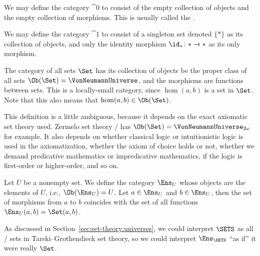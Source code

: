 \begin{example}
We may define the category $\cat{0}$ to consist of the empty
collection of objects and the empty collection of morphisms. This is
usually called the .

We may define the category $\cat{1}$ to consist of a singleton set
denoted $\{*\}$ as its collection of objects, and only the identity
morphism $\id_{*}\colon *\to *$ as its only morphism.
\end{example}

\begin{example}
\end{example}

\begin{example}
The category of all sets $\Set$ has its collection of objects be the
proper class of all sets $\Ob(\Set)=\VonNeumannUniverse$, and the
morphisms are functions between sets. This is a locally-small
category, since $\hom(a,b)$ is a set in $\Set$. Note that this also
means that $\hom(a,b)\in\Ob(\Set)$.

This definition is a little ambiguous, because it depends on the exact
axiomatic set theory used. Zermelo set theory \Z/ has
$\Ob(\Set)=\VonNeumannUniverse_{2\omega}$ for example. It also depends
on whether classical logic or intuitionistic logic is used in the
axiomatization, whether the axiom of choice holds or not, whether we
demand predicative mathematics or impredicative mathematics, if the
logic is first-order or higher-order, and so on.
\end{example}

\begin{example}
Let $U$ be a nonempty set. We define the category $\Ens_{U}$ whose
objects are the elements of $U$, i.e., $\Ob(\Ens_{U})=U$. Let
$a\in\Ens_{U}$ and $b\in\Ens_{U}$, then the set of morphisms from $a$
to $b$ coincides with the set of all functions $\Ens_{U}(a,b)=\Set(a,b)$.

As discussed in Section~\ref{sec:set-theory:universes}, we could
interpret $\SETS$ as all \ZF/ sets in Tarski--Grothendieck set theory,
so we could interpret $\Ens_{\SETS}$ ``as if'' it were really $\Set$.
\end{example}

